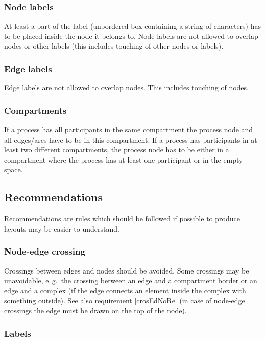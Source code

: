 \subsubsection{Node labels}

At least a part of the label (unbordered box containing a string of
characters) has to be placed inside the node it belongs to. Node
labels are not allowed to overlap nodes or other labels (this
includes touching of other nodes or labels).

\subsubsection{Edge labels}

Edge labels are not allowed to overlap nodes. This includes touching
of nodes.

\subsubsection{Compartments}

If a process has all participants in the same compartment the
process node and all edges/arcs have to be in this compartment.
If a process has participants in at least two different
compartments, the process node has to be either in a compartment
where the process has at least one participant or in the empty
space.

\subsection{Recommendations}

Recommendations are rules which should be followed if possible to
produce layouts may be easier to understand.

\subsubsection{Node-edge crossing}\label{crosEdNo}

Crossings between edges and nodes should be avoided. Some crossings
may be unavoidable, e.\,g.~the crossing between an edge and a
compartment border or an edge and a complex (if the edge connects an
element inside the complex with something outside). See also
requirement \ref{crosEdNoRe} (in case of node-edge crossings the
edge must be drawn on the top of the node).

\subsubsection{Labels}

